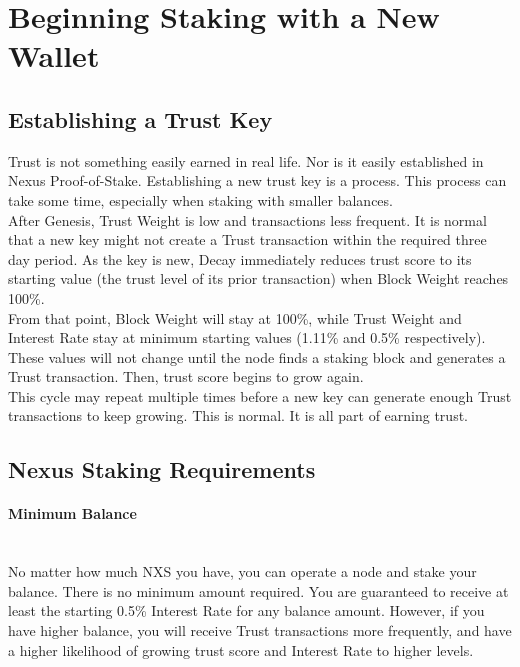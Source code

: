 \documentclass[11pt]{article}
\begin{document}
\bigskip

\section{Beginning Staking with a New Wallet}

\subsection{Establishing a Trust Key}
Trust is not something easily earned in real life. Nor is it easily established in Nexus Proof-of-Stake. Establishing a new trust key is a process. This process can take some time, especially when staking with smaller balances.\\

\noindent After Genesis, Trust Weight is low and transactions less frequent. It is normal that a new key might not create a Trust transaction within the required three day period. As the key is new, Decay immediately reduces trust score to its starting value (the trust level of its prior transaction) when Block Weight reaches 100\%.\\ 

\noindent From that point, Block Weight will stay at 100\%, while Trust Weight and Interest Rate stay at minimum starting values (1.11\% and 0.5\% respectively). These values will not change until the node finds a staking block and generates a Trust transaction. Then, trust score begins to grow again.\\

\noindent This cycle may repeat multiple times before a new key can generate enough Trust transactions to keep growing. This is normal. It is all part of earning trust.\\

\subsection{Nexus Staking Requirements}

\paragraph{Minimum Balance} ~\\
No matter how much NXS you have, you can operate a node and stake your balance. There is no minimum amount required. You are guaranteed to receive at least the starting 0.5\% Interest Rate for any balance amount. However, if you have higher balance, you will receive Trust transactions more frequently, and have a higher likelihood of growing trust score and Interest Rate to higher levels.
\end{document}
